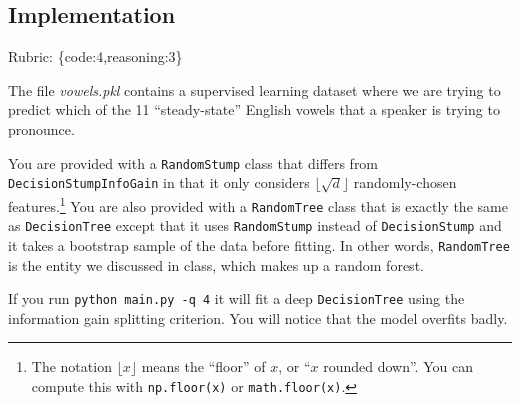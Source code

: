 \documentclass{article}
\def\rubric#1{\gre{Rubric: \{#1\}}}{}
\def\gre#1{{\color{gre}#1}}
\begin{document}
\subsection{Implementation}
\rubric{code:4,reasoning:3}

The file \emph{vowels.pkl} contains a supervised learning dataset where we are trying to predict which of the 11 ``steady-state'' English vowels that a speaker is trying to pronounce.

You are provided with a \texttt{RandomStump} class that differs from
\texttt{DecisionStumpInfoGain} in that
it only considers $\lfloor \sqrt{d} \rfloor$ randomly-chosen features.\footnote{The notation $\lfloor x\rfloor$ means the ``floor'' of $x$, or ``$x$ rounded down''. You can compute this with \texttt{np.floor(x)} or \texttt{math.floor(x)}.}
You are also provided with a \texttt{RandomTree} class that is exactly the same as
\texttt{DecisionTree} except that it uses \texttt{RandomStump} instead of
\texttt{DecisionStump} and it takes a bootstrap sample of the data before fitting.
In other words, \texttt{RandomTree} is the entity we discussed in class, which
makes up a random forest.

If you run \texttt{python main.py -q 4} it will fit a deep \texttt{DecisionTree}
using the information gain splitting criterion. You will notice that the model overfits badly.
\end{document}
